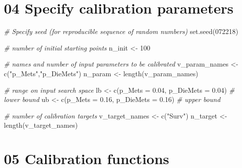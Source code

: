 \documentclass[
]{article}
\newenvironment{Shaded}{\begin{snugshade}}{\end{snugshade}}
\newcommand{\AttributeTok}[1]{\textcolor[rgb]{0.77,0.63,0.00}{#1}}
\newcommand{\CommentTok}[1]{\textcolor[rgb]{0.56,0.35,0.01}{\textit{#1}}}
\newcommand{\DecValTok}[1]{\textcolor[rgb]{0.00,0.00,0.81}{#1}}
\newcommand{\FloatTok}[1]{\textcolor[rgb]{0.00,0.00,0.81}{#1}}
\newcommand{\FunctionTok}[1]{\textcolor[rgb]{0.00,0.00,0.00}{#1}}
\newcommand{\NormalTok}[1]{#1}
\newcommand{\OtherTok}[1]{\textcolor[rgb]{0.56,0.35,0.01}{#1}}
\newcommand{\StringTok}[1]{\textcolor[rgb]{0.31,0.60,0.02}{#1}}
\begin{document}
\hypertarget{specify-calibration-parameters}{%
\section{04 Specify calibration
parameters}\label{specify-calibration-parameters}}

\begin{Shaded}
\begin{Highlighting}[]
\CommentTok{\# Specify seed (for reproducible sequence of random numbers)}
\FunctionTok{set.seed}\NormalTok{(}\DecValTok{072218}\NormalTok{)}

\CommentTok{\# number of initial starting points}
\NormalTok{n\_init }\OtherTok{\textless{}{-}} \DecValTok{100}

\CommentTok{\# names and number of input parameters to be calibrated}
\NormalTok{v\_param\_names }\OtherTok{\textless{}{-}} \FunctionTok{c}\NormalTok{(}\StringTok{"p\_Mets"}\NormalTok{,}\StringTok{"p\_DieMets"}\NormalTok{)}
\NormalTok{n\_param }\OtherTok{\textless{}{-}} \FunctionTok{length}\NormalTok{(v\_param\_names)}

\CommentTok{\# range on input search space}
\NormalTok{lb }\OtherTok{\textless{}{-}} \FunctionTok{c}\NormalTok{(}\AttributeTok{p\_Mets =} \FloatTok{0.04}\NormalTok{, }\AttributeTok{p\_DieMets =} \FloatTok{0.04}\NormalTok{) }\CommentTok{\# lower bound}
\NormalTok{ub }\OtherTok{\textless{}{-}} \FunctionTok{c}\NormalTok{(}\AttributeTok{p\_Mets =} \FloatTok{0.16}\NormalTok{, }\AttributeTok{p\_DieMets =} \FloatTok{0.16}\NormalTok{) }\CommentTok{\# upper bound}

\CommentTok{\# number of calibration targets}
\NormalTok{v\_target\_names }\OtherTok{\textless{}{-}} \FunctionTok{c}\NormalTok{(}\StringTok{"Surv"}\NormalTok{)}
\NormalTok{n\_target }\OtherTok{\textless{}{-}} \FunctionTok{length}\NormalTok{(v\_target\_names)}
\end{Highlighting}
\end{Shaded}

\hypertarget{calibration-functions}{%
\section{05 Calibration functions}\label{calibration-functions}}
\end{document}
